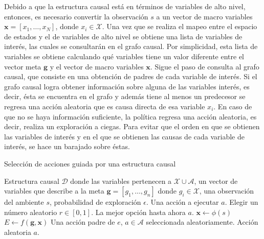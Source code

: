 Debido a que la estructura causal está en términos de variables de alto nivel,
entonces, es necesario convertir la observación $s$ a un vector de macro variables $\mathbf{x} = [x_1, \dots, x_N]$, donde $x_i \in \mathcal{X}$. 
Una vez que se
realiza el mapeo entre el espacio de
estados y el de variables de alto nivel se obtiene una lista de variables
de interés, las cuales se consultarán en el grafo causal.
Por simplicidad, esta lista de variables se obtiene calculando
qué variables tiene un valor diferente entre el vector meta $\mathbf{g}$
y el vector de macro variables $\mathbf{x}$.
Sigue el paso de consulta al grafo causal, que consiste en una
obtención de padres de cada variable de interés. Si el grafo causal
logra obtener información sobre alguna de las variables interés, es decir,
ésta se encuentra en el grafo y además tiene al menos un predecesor
se regresa una acción aleatoria que es causa directa de esa variable $x_i$.
En caso de que no se haya información suficiente, la política regresa una acción aleatoria,
es decir, realiza un exploración a ciegas. Para evitar que el orden en que
se obtienen las variables de interés y en el que se obtienen las causas de 
cada variable de interés, se hace un barajado sobre éstas.

\begin{algorithm}[H]
  \caption{Selección de acciones guiada por una estructura causal \label{alg:guided-action-selection}}
  \begin{algorithmic}[1]
  \REQUIRE Estructura causal $\mathcal{D}$ donde las variables pertenecen a $\mathcal{X} \cup \mathcal{A}$, un vector de variables
  que describe a la meta $\mathbf{g} = [g_1, \dots, g_n]$ donde $g_i \in \mathcal{X}$, una observación del ambiente $s$, probabilidad de exploración $\epsilon$.
  \ENSURE Una acción a ejecutar $a$.
  \STATE Elegir un número aleatorio $r \in [0, 1]$.
    \RETURN La mejor opción hasta ahora $a$.
   \ENDIF
  \STATE $\mathbf{x} \leftarrow \phi(s)$ 
   \STATE $E \leftarrow f(\mathbf{g}, \mathbf{x})$ 
        \RETURN Una acción padre de $e$, $a \in \mathcal{A}$ seleccionada aleatoriamente.
    \ENDIF
    \ENDFOR
    \RETURN Acción aleatoria $a$.
  \end{algorithmic}
\end{algorithm}


